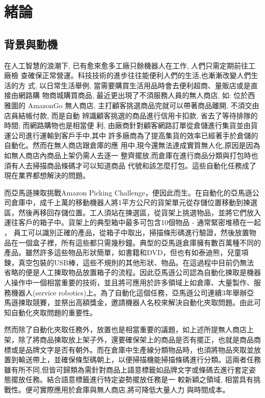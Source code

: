\chapter{緒論}
\label{chapter:intro}

\section{背景與動機}

在人工智慧的浪潮下, 已有愈來愈多工廠只餘機器人在工作, 人們只需定期前往工廠檢
查確保正常營運。科技技術的進步往往能便利人們的生活,也漸漸改變人們生活的方
式, 以日常生活舉例, 當需要購買生活用品時會去便利超商、量販店或是直接由網路購
物商城購買商品, 最近更出現了不須服務人員的無人商店, 如: 位於西雅圖的 AmazonGo
無人商店, 主打顧客挑選商品完就可以帶著商品離開, 不須交由店員結帳付款, 而是自動
辨識顧客挑選的商品進行信用卡扣款, 省去了等待排隊的時間; 而網路購物也是相當便
利, 由廠商針對顧客網路訂單從倉儲進行集貨並由貨運公司進行運輸到客戶手中,其中
許多廠商為了提高集貨的效率已經著手於倉儲的自動化。然而在無人商店跟倉庫的應
用中,現今還無法達成實質無人化,原因是因為如無人商店內商品上架仍需人去逐一
整齊擺放,而倉庫在進行商品分類與打包時也須有人去掃描商品條碼才可以知道商品
代號和該怎麼打包。這些自動化任務成了現在業界都想解決的問題。


而亞馬遜揀取挑戰Amazon Picking Challenge，便因此而生。在自動化的亞馬遜公司倉庫中，成千上萬的移動機器人將1平方公尺的貨架單元從存儲位置移動到揀選區，然後再移回存儲位置。工人須站在揀選區，從貨架上挑選物品，並將它們放入運往客戶的箱子中。貨架上的典型箱中最多可包含10個物品 - 通常緊密堆積在一起 ， 員工可以識別正確的產品，從箱子中取出，掃描條形碼進行驗證，然後放置物品在一個盒子裡，所有這些都只需幾秒鐘。典型的亞馬遜倉庫擁有數百萬種不同的產品。雖然許多這些物品形狀簡單，如書籍和DVD，但也有如泰迪熊，兒童項鍊，真空包裝的USB棒，這些不規則的其他形狀、物品。在這過程中目前仍無法省略的便是人工揀取物品放置箱子的流程。因此亞馬遜公司認為自動化揀取是機器人操作中一個相當重要的技術，並且將可應用於許多領域上如倉庫、大量製作、服務機器人(service robotics)上。為了自動化這個任務，亞馬遜公司連續3年舉辦亞馬遜揀取競賽，並祭出高額獎金，邀請機器人名校來解決自動化夾取問題。由此可知自動化夾取問題的重要性。


然而除了自動化夾取任務外，放置也是相當重要的議題，如上述所提無人商店上架，除了將商品揀取放上架子外，還要確保架上的商品是否有擺正，也就是商品商標或是品牌文字是否有朝外。而在倉庫中生產線分類物品時，也須將物品夾取並放置到輸送帶上，並確保條型碼朝上，以便掃描機能掃描條碼進行分類。這兩者任務雖有所不同,但皆可歸類為需針對商品上語意標籤如品牌文字或條碼去進行套定姿態擺放任務。結合語意標籤進行特定姿勢擺放任務是一
較新穎之領域, 相當具有挑戰性。便可實際應用於倉庫與無人商店,將可降低大量人力
與時間成本。



